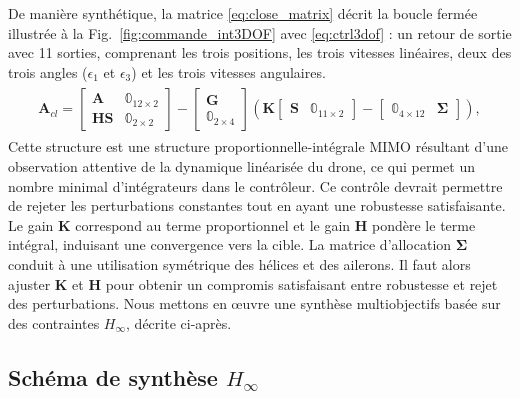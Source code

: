 De manière synthétique, la matrice \eqref{eq:close_matrix} décrit la boucle fermée illustrée à la Fig.~\ref{fig:commande_int3DOF} avec \eqref{eq:ctrl3dof} : un retour de sortie avec 11 sorties, comprenant les trois positions, les trois vitesses linéaires, deux des trois angles ($\epsilon_{1}$ et $\epsilon_{3}$) et les trois vitesses angulaires.
\begin{align} \label{eq:close_matrix}
    \begin{gathered}
        \boldsymbol{A}_{cl} \!= \!
        \begin{bmatrix}\boldsymbol{A} & \mathbb{0}_{12\times 2} \\ \boldsymbol{H}\boldsymbol{S} & \mathbb{0}_{2\times 2}\end{bmatrix} \!- \!\begin{bmatrix}\boldsymbol{G} \\ \mathbb{0}_{2\times 4}\end{bmatrix} \left( \boldsymbol{K} \begin{bmatrix}\boldsymbol{S} & \mathbb{0}_{11\times 2}\end{bmatrix} -  \begin{bmatrix}\mathbb{0}_{4\times 12} & \boldsymbol{\Sigma} \end{bmatrix}\right),
    \end{gathered}
\end{align}
Cette structure est une structure proportionnelle-intégrale MIMO  résultant d'une observation attentive de la dynamique linéarisée du drone, ce qui permet un nombre minimal d'intégrateurs dans le contrôleur. Ce contrôle devrait permettre de rejeter les perturbations constantes tout en ayant une robustesse satisfaisante. Le gain $\boldsymbol{K}$ correspond au terme proportionnel et le gain $\boldsymbol{H}$ pondère le terme intégral, induisant une convergence vers la cible. La matrice d'allocation $\boldsymbol{\Sigma}$ conduit à une utilisation symétrique des hélices et des ailerons. Il faut alors ajuster $\boldsymbol{K}$ et $\boldsymbol{H}$ pour obtenir un compromis satisfaisant entre robustesse et rejet des perturbations. Nous mettons en œuvre une synthèse multiobjectifs basée sur des contraintes $H_{\infty}$, décrite ci-après.

\subsection{Schéma de synthèse $H_{\infty}$}
 \label{sec:h_inf3DOF}

